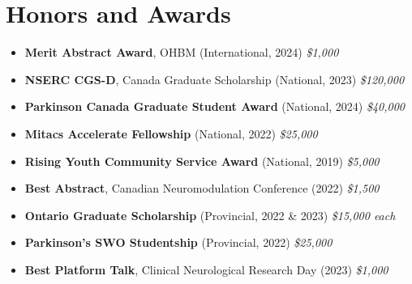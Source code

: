 \section*{Honors and Awards} \sectionline
\begin{itemize}
  \item \textbf{Merit Abstract Award}, OHBM (International, 2024) \hfill \textit{\$1,000}
  \item \textbf{NSERC CGS-D}, Canada Graduate Scholarship (National, 2023) \hfill \textit{\$120,000}
  \item \textbf{Parkinson Canada Graduate Student Award} (National, 2024) \hfill \textit{\$40,000}
  \item \textbf{Mitacs Accelerate Fellowship} (National, 2022) \hfill \textit{\$25,000}
  \item \textbf{Rising Youth Community Service Award} (National, 2019) \hfill \textit{\$5,000}
  \item \textbf{Best Abstract}, Canadian Neuromodulation Conference (2022) \hfill \textit{\$1,500}
  \item \textbf{Ontario Graduate Scholarship} (Provincial, 2022 \& 2023) \hfill \textit{\$15,000 each}
  \item \textbf{Parkinson’s SWO Studentship} (Provincial, 2022) \hfill \textit{\$25,000}
  \item \textbf{Best Platform Talk}, Clinical Neurological Research Day (2023) \hfill \textit{\$1,000}
\end{itemize}

